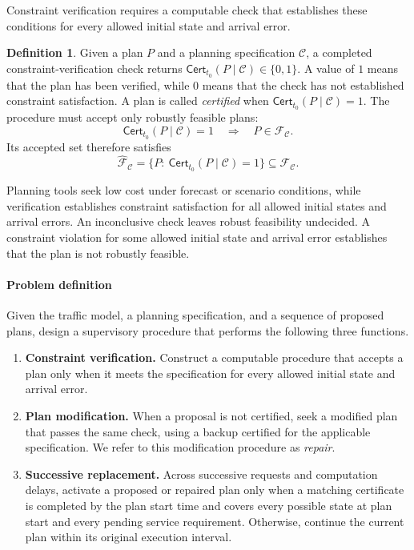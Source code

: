 \documentclass[final]{cas-sc}
\theoremstyle{definition}
\theoremstyle{plain}
\theoremstyle{definition}
\newtheorem{definition}{Definition}
\theoremstyle{plain}
\begin{document}
Constraint verification requires a computable check that establishes
these conditions for every allowed initial state and arrival error.

\begin{definition}
\label{def:feasibility-certificate}
Given a plan $P$ and a planning specification $\mathcal C$, a completed
constraint-verification check returns
$\mathsf{Cert}_{t_0}(P\mid\mathcal C)\in\{0,1\}$. A value of $1$ means
that the plan has been verified, while $0$ means that the check has not
established constraint satisfaction. A plan is called \emph{certified}
when $\mathsf{Cert}_{t_0}(P\mid\mathcal C)=1$. The procedure must accept only
robustly feasible plans:
\[
\mathsf{Cert}_{t_0}(P\mid\mathcal C)=1\quad\Longrightarrow\quad
P\in\mathcal F_{\mathcal C}.
\]
Its accepted set therefore satisfies
\begin{equation}
\widehat{\mathcal F}_{\mathcal C}
=\{P:\ \mathsf{Cert}_{t_0}(P\mid\mathcal C)=1\}\subseteq\mathcal F_{\mathcal C}.
\label{eq:benchmark-certifiable-set}
\end{equation}
\end{definition}

Planning tools seek low cost under forecast or scenario conditions,
while verification establishes constraint satisfaction for all allowed
initial states and arrival errors. An inconclusive check leaves robust
feasibility undecided. A constraint violation for some allowed initial
state and arrival error establishes that the plan is not robustly
feasible.

\paragraph{Problem definition}
\label{prob:supervised-planning}
Given the traffic model, a planning
specification, and a sequence of proposed plans, design a supervisory
procedure that performs the following three functions.
\begin{enumerate}
\item \textbf{Constraint verification.} Construct a computable
procedure that accepts a plan only when it meets the specification for
every allowed initial state and arrival error.
\item \textbf{Plan modification.} When a proposal is not certified,
seek a modified plan that passes the same check, using a backup
certified for the applicable specification. We refer to this
modification procedure as \emph{repair}.
\item \textbf{Successive replacement.} Across successive requests and
computation delays, activate a proposed or repaired plan only when a
matching certificate is completed by the plan start time and covers
every possible state at plan start and every pending service
requirement. Otherwise, continue the current plan within its original
execution interval.
\end{enumerate}
\end{document}
